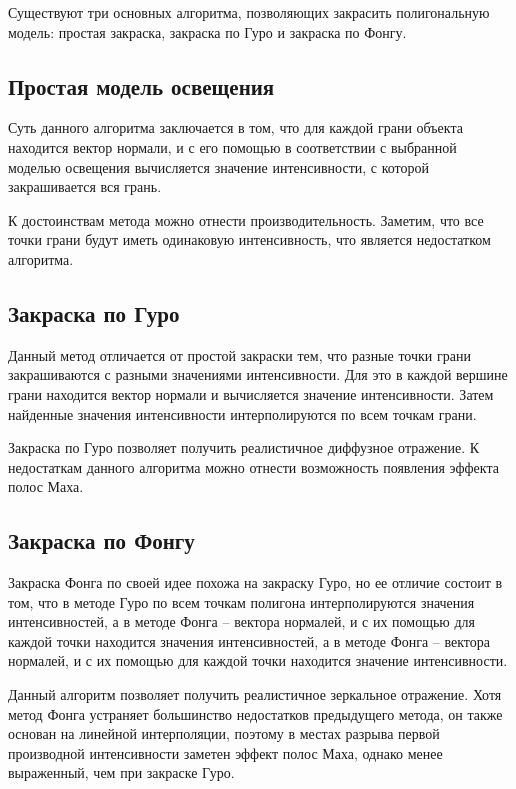 Существуют три основных алгоритма, позволяющих закрасить полигональную модель: простая закраска, закраска по Гуро и закраска по Фонгу.

\subsection{Простая модель освещения}

Суть данного алгоритма заключается в том, что для каждой грани объекта находится вектор нормали, и с его помощью в соответствии с выбранной моделью освещения вычисляется значение интенсивности, с которой закрашивается вся грань. \cite{Dunn}

К достоинствам метода можно отнести производительность.
Заметим, что все точки грани будут иметь одинаковую интенсивность, что является недостатком алгоритма.

\subsection{Закраска по Гуро}

Данный метод отличается от простой закраски тем, что разные точки грани закрашиваются с разными значениями интенсивности.
Для это в каждой вершине грани находится вектор нормали и вычисляется значение интенсивности. Затем найденные значения интенсивности интерполируются по всем точкам грани. \cite{Dunn}

Закраска по Гуро позволяет получить реалистичное диффузное отражение.
К недостаткам данного алгоритма можно отнести возможность появления эффекта полос Маха.

\subsection{Закраска по Фонгу}

Закраска Фонга по своей идее похожа на закраску Гуро, но ее отличие состоит в том, что в методе Гуро по всем точкам полигона интерполируются значения интенсивностей, а в методе Фонга – вектора нормалей, и с их помощью для каждой точки находится значения интенсивностей, а в методе Фонга – вектора нормалей, и с их помощью для каждой точки находится значение интенсивности. \cite{Dunn}

Данный алгоритм позволяет получить реалистичное зеркальное отражение.
Хотя метод Фонга устраняет большинство недостатков предыдущего метода, он также основан на линейной интерполяции, поэтому в местах разрыва первой производной интенсивности заметен эффект полос Маха, однако менее выраженный, чем при закраске Гуро.


